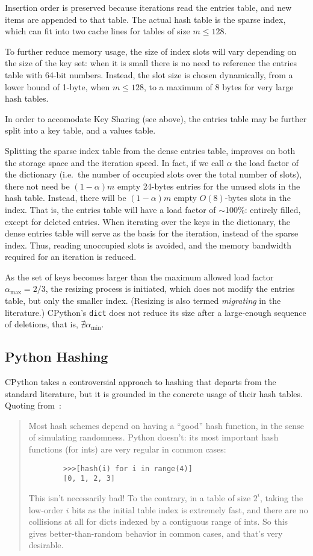 Insertion order is preserved because iterations read the entries table, and new items are appended to that table.
The actual hash table is the sparse index, which can fit into two cache lines for tables of size $m \leq 128$.

To further reduce memory usage, the size of index slots will vary depending on the size of the key set: when it is small there is no need to reference the entries table with 64-bit numbers.
Instead, the slot size is chosen dynamically, from a lower bound of 1-byte, when $m \leq 128$, to a maximum of 8 bytes for very large hash tables.

In order to accomodate Key Sharing (see above), the entries table may be further split into a key table, and a values table.

Splitting the sparse index table from the dense entries table, improves on both the storage space and the iteration speed.
In fact, if we call $\alpha$ the load factor of the dictionary (i.e.\ the number of occupied slots over the total number of slots), there not need be $(1 - \alpha)m$ empty 24-bytes entries for the unused slots in the hash table.
Instead, there will be $(1 - \alpha)m$ empty $O(8)$-bytes slots in the index.
That is, the entries table will have a load factor of $\sim$100\%: entirely filled, except for deleted entries.
When iterating over the keys in the dictionary, the dense entries table will serve as the basis for the iteration, instead of the sparse index.
Thus, reading unoccupied slots is avoided, and the memory bandwidth required for an iteration is reduced.

As the set of keys becomes larger than the maximum allowed load factor $\alpha_{\max} = 2/3$, the resizing process is initiated, which does not modify the entries table, but only the smaller index.
(Resizing is also termed \emph{migrating} in the literature.)
CPython's \texttt{dict} does not reduce its size after a large-enough sequence of deletions, that is, $\nexists\alpha_{\min}$.


\subsection{Python Hashing}\label{subsec:python-generated-hash-values}

CPython takes a controversial approach to hashing that departs from the standard literature, but it is grounded in the concrete usage of their hash tables.
Quoting from~\cite{dict-comment-hash}:
\begin{quote}
	Most hash schemes depend on having a ``good'' hash function, in the sense of simulating randomness.
	Python doesn't:  its most important hash functions (for ints) are very regular in common cases:
	\begin{verbatim}
		>>>[hash(i) for i in range(4)]
	  	[0, 1, 2, 3]
	\end{verbatim}
	This isn't necessarily bad!
	To the contrary, in a table of size $2^i$, taking the low-order $i$ bits as the initial table index is extremely fast, and there are no collisions at all for dicts indexed by a contiguous range of ints.
	So this gives better-than-random behavior in common cases, and that's very desirable.
\end{quote}

